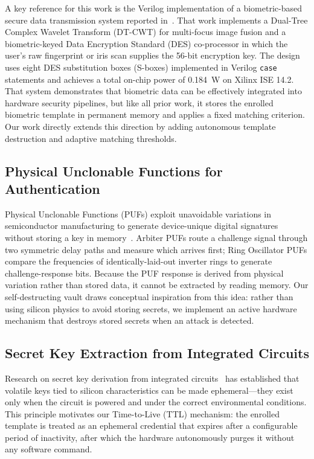 \documentclass[conference]{IEEEtran}
\begin{document}
A key reference for this work is the Verilog implementation of a
biometric-based secure data transmission system reported
in~\cite{verilog_biometric}. That work implements a Dual-Tree Complex
Wavelet Transform (DT-CWT) for multi-focus image fusion and a
biometric-keyed Data Encryption Standard (DES) co-processor in which
the user's raw fingerprint or iris scan supplies the 56-bit encryption
key. The design uses eight DES substitution boxes (S-boxes) implemented
in Verilog \texttt{case} statements and achieves a total on-chip power
of 0.184~W on Xilinx ISE 14.2. That system demonstrates that biometric
data can be effectively integrated into hardware security pipelines,
but like all prior work, it stores the enrolled biometric template in
permanent memory and applies a fixed matching criterion. Our work
directly extends this direction by adding autonomous template
destruction and adaptive matching thresholds.

\subsection{Physical Unclonable Functions for Authentication}

Physical Unclonable Functions (PUFs) exploit unavoidable variations in
semiconductor manufacturing to generate device-unique digital
signatures without storing a key in memory~\cite{puf_auth}. Arbiter
PUFs route a challenge signal through two symmetric delay paths and
measure which arrives first; Ring Oscillator PUFs compare the
frequencies of identically-laid-out inverter rings to generate
challenge-response bits. Because the PUF response is derived from
physical variation rather than stored data, it cannot be extracted by
reading memory. Our self-destructing vault draws conceptual inspiration
from this idea: rather than using silicon physics to avoid storing
secrets, we implement an active hardware mechanism that destroys stored
secrets when an attack is detected.

\subsection{Secret Key Extraction from Integrated Circuits}

Research on secret key derivation from integrated circuits~\cite{secret_key_ic}
has established that volatile keys tied to silicon characteristics
can be made ephemeral---they exist only when the circuit is powered
and under the correct environmental conditions. This principle
motivates our Time-to-Live (TTL) mechanism: the enrolled template
is treated as an ephemeral credential that expires after a configurable
period of inactivity, after which the hardware autonomously purges it
without any software command.
\end{document}

